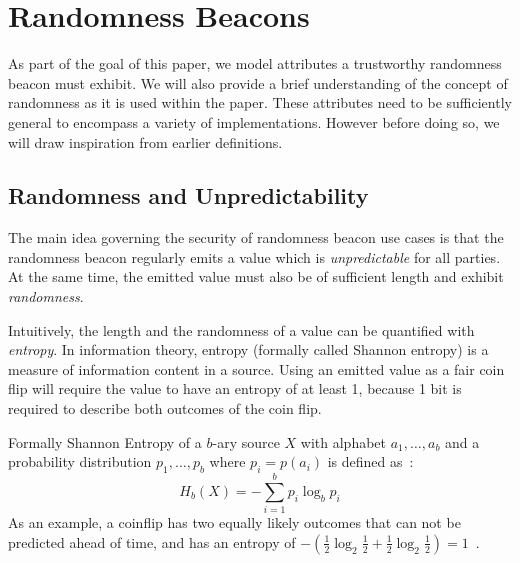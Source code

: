 \section{Randomness Beacons}\label{sec:beacons}

As part of the goal of this paper, we model attributes a trustworthy randomness beacon must exhibit.
We will also provide a brief understanding of the concept of randomness as it is used within the paper.
These attributes need to be sufficiently general to encompass a variety of implementations.
However before doing so, we will draw inspiration from earlier definitions.

\subsection{Randomness and Unpredictability}\label{sub:beacons_randomness}
The main idea governing the security of randomness beacon use cases is that the randomness beacon regularly emits a value which is \emph{unpredictable} for all parties. At the same time, the emitted value must also be of sufficient length and exhibit \emph{randomness}.

Intuitively, the length and the randomness of a value can be quantified with \emph{entropy}. In information theory, entropy (formally called Shannon entropy) is a measure of information content in a source. Using an emitted value as a fair coin flip will require the value to have an entropy of at least 1, because 1 bit is required to describe both outcomes of the coin flip.

Formally Shannon Entropy of a $b$-ary source $X$ with alphabet ${a_1, \ldots, a_b}$ and a probability distribution ${p_1, \ldots , p_b}$ where $p_i = p(a_i)$ is defined as~\cite{informationtheory}:
$$
H_{b} (X) = -\sum\limits_{i = 1}^b p_{i}\log_{b} p_{i}
$$
As an example, a coinflip has two equally likely outcomes that can not be predicted ahead of time, and has an entropy of $-(\frac{1}{2}\log_2 \frac{1}{2} + \frac{1}{2}\log_2 \frac{1}{2}) = 1$~\cite{informationtheory}.

